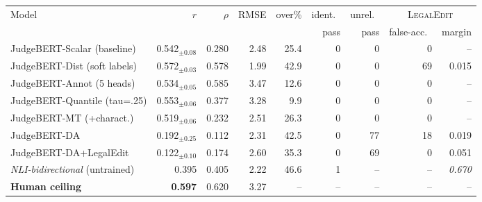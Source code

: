 \setlength{\tabcolsep}{4pt}
\begin{tabular}{lrrrrrrrr}
\toprule
Model & $r$ & $\rho$ & RMSE & over\% & ident.\ & unrel.\ & \multicolumn{2}{c}{\textsc{LegalEdit}} \\
\cmidrule(lr){8-9}
 &  &  &  &  & pass & pass & false-acc.\ & margin \\
\midrule
JudgeBERT-Scalar (baseline) & 0.542$_{\pm0.08}$ & 0.280 & 2.48 & 25.4 & 0 & 0 & 0 & -- \\
JudgeBERT-Dist (soft labels) & 0.572$_{\pm0.03}$ & 0.578 & 1.99 & 42.9 & 0 & 0 & 69 & 0.015 \\
JudgeBERT-Annot (5 heads) & 0.534$_{\pm0.05}$ & 0.585 & 3.47 & 12.6 & 0 & 0 & 0 & -- \\
JudgeBERT-Quantile (tau=.25) & 0.553$_{\pm0.06}$ & 0.377 & 3.28 & 9.9 & 0 & 0 & 0 & -- \\
JudgeBERT-MT (+charact.) & 0.519$_{\pm0.06}$ & 0.232 & 2.51 & 26.3 & 0 & 0 & 0 & -- \\
\midrule
JudgeBERT-DA & 0.192$_{\pm0.25}$ & 0.112 & 2.31 & 42.5 & 0 & 77 & 18 & 0.019 \\
JudgeBERT-DA+LegalEdit & 0.122$_{\pm0.10}$ & 0.174 & 2.60 & 35.3 & 0 & 69 & 0 & 0.051 \\
\midrule
\emph{NLI-bidirectional} (untrained) & 0.395 & 0.405 & 2.22 & 46.6 & 1 & -- & -- & \emph{0.670} \\
\textbf{Human ceiling} & \textbf{0.597} & 0.620 & 3.27 & -- & -- & -- & -- & -- \\
\bottomrule
\end{tabular}